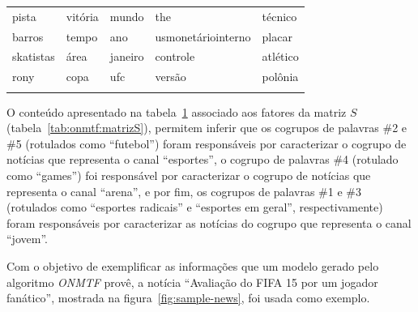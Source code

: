 \documentclass[
    12pt,                %
    oneside,            %
    a4paper,            %
    english,            %
    brazil                %
    ]{abntex2ppgsi}
\begin{document}
\begin{table}[H]
{\begin{tabular}{lllll}
            pista      & vitória    & mundo      & the                & técnico \\
            barros     & tempo      & ano        & usmonetáriointerno & placar \\
            skatistas  & área       & janeiro    & controle           & atlético \\
            rony       & copa       & ufc        & versão             & polônia \\
            \hline \\
        \end{tabular}
    }
    \label{tab:experiments-quali-words:onmtf}
\end{table}

O conteúdo apresentado na tabela~\ref{tab:experiments-quali-words:onmtf} associado aos fatores da matriz $S$ (tabela~\ref{tab:onmtf:matrizS}), permitem inferir que os cogrupos de palavras \#2 e \#5 (rotulados como ``futebol'') foram responsáveis por caracterizar o cogrupo de notícias que representa o canal ``esportes'', o cogrupo de palavras \#4 (rotulado como ``games'') foi responsável por caracterizar o cogrupo de notícias que representa o canal ``arena'', e por fim, os cogrupos de palavras \#1 e \#3 (rotulados como ``esportes radicais'' e ``esportes em geral'', respectivamente) foram responsáveis por caracterizar as notícias do cogrupo que representa o canal ``jovem''.


Com o objetivo de exemplificar as informações que um modelo gerado pelo algoritmo \textit{ONMTF} provê, a notícia ``Avaliação do FIFA 15 por um jogador fanático'', mostrada na figura~\ref{fig:sample-news}, foi usada como exemplo.
\end{document}
